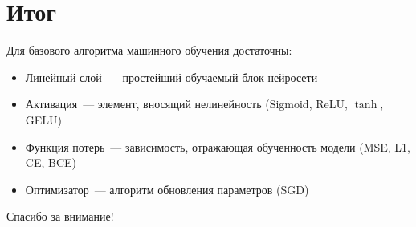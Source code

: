 \documentclass{beamer}
\begin{document}
\section{Итог}

\begin{frame}{\secname}
  Для базового алгоритма машинного обучения достаточны:
  \begin{itemize}
    \item Линейный слой~--- простейший обучаемый блок нейросети
    \item Активация~--- элемент, вносящий нелинейность (Sigmoid,
      ReLU, $\tanh$, GELU)
    \item Функция потерь~--- зависимость, отражающая обученность
      модели (MSE, L1, CE, BCE)
    \item Оптимизатор~--- алгоритм обновления параметров (SGD)
  \end{itemize}
\end{frame}

\begin{frame}
  \begin{center}
    \Huge Спасибо за внимание!
  \end{center}
\end{frame}
\end{document}
